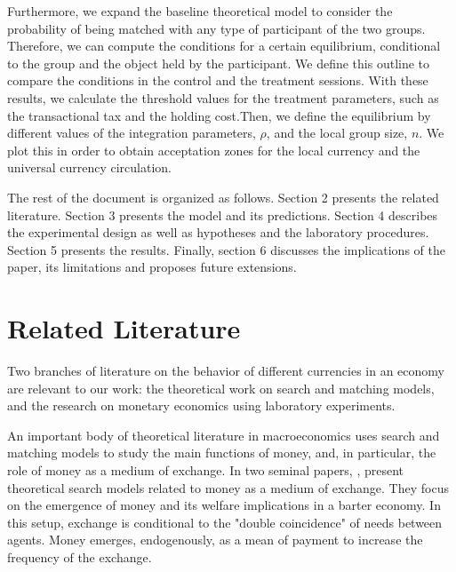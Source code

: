 Furthermore, we expand the baseline theoretical model to consider the probability of being matched with any type of participant of the two groups. Therefore, we can compute the conditions for a certain equilibrium, conditional to the group and the object held by the participant. We define this outline to compare the conditions in the control and the treatment sessions. With these results, we calculate the threshold values for the treatment parameters, such as the transactional tax and the holding cost.Then, we define the equilibrium by different values of the integration parameters, $\rho$, and the local group size, $n$. We plot this in order to obtain acceptation zones for the local currency and the universal currency circulation.

The rest of the document is organized as follows. Section 2 presents the related literature. Section 3 presents the model and its predictions. Section 4 describes the experimental design as well as hypotheses and the laboratory procedures. Section 5 presents the results. Finally, section 6 discusses the implications of the paper, its limitations and proposes future extensions.

\section{Related Literature}
\label{Literature}

Two branches of literature on the behavior of different currencies in an economy are relevant to our work: the theoretical work on search and matching models, and the research on monetary economics using laboratory experiments. 

An important body of theoretical literature in macroeconomics uses search and matching models to study the main functions of money, and, in particular, the role of money as a medium of exchange. 
In two seminal papers, \cite{10.2307/1832197, RePEc:aea:aecrev:v:83:y:1993:i:1:p:63-77}, present  theoretical search models related to money as a medium of exchange. They focus on the emergence of money and its welfare implications in a barter economy. In this setup, exchange is conditional to the "double coincidence" of needs between agents. Money emerges, endogenously, as a mean of payment to increase the frequency of the exchange. 

